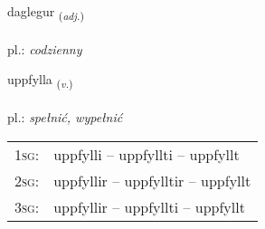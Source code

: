 \documentclass[frontgrid, backgrid]{flacards}\usepackage[]{graphicx}\usepackage[]{xcolor}
\begin{document}
\renewcommand{\flhead}{\vskip5pt \fboxsep=0pt {\small\bfseries\footnotesize Lýsingarorð | Adjective}}
\renewcommand{\fcfoot}{\vskip5pt \fboxsep=0pt \hspace{2pt}{\small\bfseries\footnotesize 2K}}

\renewcommand{\blhead}{\vskip5pt {\small\bfseries\footnotesize Lýsingarorð | Adjective }}
\renewcommand{\bcfoot}{\vskip5pt \hspace{2pt}{\small\bfseries\footnotesize 2K}}


{daglegur \small{\textsubscript{(\textit{adj.})}} \\[1ex] %
\textphonetic{[taɣlɛɣʏr]} \\
pl.: \emph{codzienny} \\  [2ex]
\renewcommand*{\arraystretch}{0.8}
}

\renewcommand{\flhead}{\vskip5pt \fboxsep=0pt {\small\bfseries\footnotesize Sagnorð | Verb}}
\renewcommand{\fcfoot}{\vskip5pt \fboxsep=0pt \hspace{2pt}{\small\bfseries\footnotesize 2K}}

\renewcommand{\blhead}{\vskip5pt {\small\bfseries\footnotesize Sagnorð | Verb }}
\renewcommand{\bcfoot}{\vskip5pt \hspace{2pt}{\small\bfseries\footnotesize 2K}}


{uppfylla \small{\textsubscript{(\textit{v.})}} \\[1ex] %
\textphonetic{[ʏhpfɪtla]} \\
pl.: \emph{spełnić, wypełnić} \\  [2ex]
\renewcommand*{\arraystretch}{0.8}
\begin{tabular}{p{1cm}l}
\textsc{1sg}: & uppfylli -- uppfyllti -- uppfyllt \\ 
\textsc{2sg}: & uppfyllir -- uppfylltir -- uppfyllt \\ 
\textsc{3sg}: & uppfyllir -- uppfyllti -- uppfyllt \\ 
\end{tabular}
}
\end{document}
